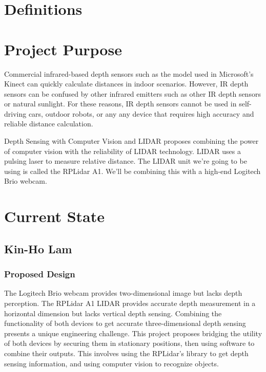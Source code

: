 \documentclass[onecolumn, draftclsnofoot,10pt, compsoc]{IEEEtran}
\begin{document}
\begin{singlespace}
	\section{Definitions}

	\section{Project Purpose}
		Commercial infrared-based depth sensors such as the model used in Microsoft's Kinect can quickly calculate distances in indoor scenarios.
		However, IR depth sensors can be confused by other infrared emitters such as other IR depth sensors or natural sunlight.
		For these reasons, IR depth sensors cannot be used in self-driving cars, outdoor robots, or any any device that requires high accuracy and reliable distance calculation.

		Depth Sensing with Computer Vision and LIDAR proposes combining the power of computer vision with the reliability of LIDAR technology.
		LIDAR uses a pulsing laser to measure relative distance.
		The LIDAR unit we're going to be using is called the RPLidar A1.
		We'll be combining this with a high-end Logitech Brio webcam.

	\section{Current State}

	\subsection{Kin-Ho Lam}
		\subsubsection{Proposed Design}
			The Logitech Brio webcam provides two-dimensional image but lacks depth perception.
			The RPLidar A1 LIDAR provides accurate depth measurement in a horizontal dimension but lacks vertical depth sensing.
			Combining the functionality of both devices to get accurate three-dimensional depth sensing presents a unique engineering challenge.
			This project proposes bridging the utility of both devices by securing them in stationary positions, then using software to combine their outputs.
			This involves using the RPLidar's library to get depth sensing information, and using computer vision to recognize objects.
			

\end{singlespace}
\end{document}
